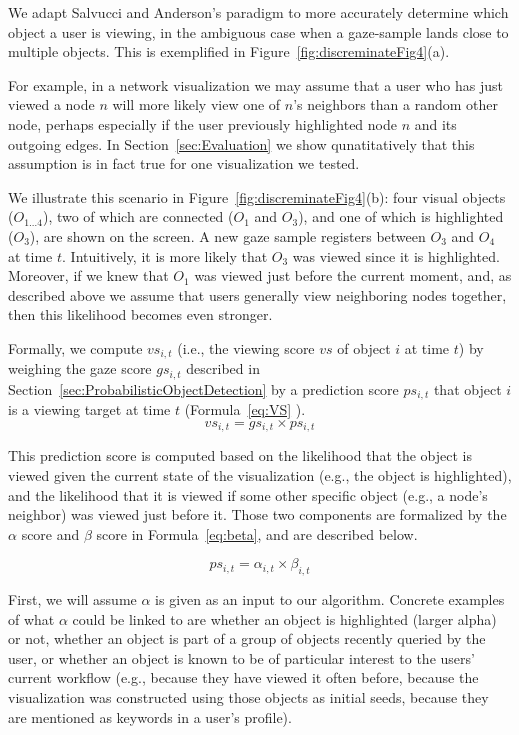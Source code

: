 We adapt Salvucci and Anderson's paradigm to more accurately determine which object a user is viewing, in the ambiguous case when a gaze-sample lands close to multiple objects. This is exemplified in Figure~\ref{fig:discreminateFig4}(a). 

For example, in a network visualization we may assume that a user who has just viewed a node $n$ will more likely view one of $n$'s neighbors than a random other node, perhaps especially if the user previously highlighted node $n$ and its outgoing edges.  In Section~\ref{sec:Evaluation} we show qunatitatively that this assumption is in fact true for one visualization we tested.  

We illustrate this scenario in Figure~\ref{fig:discreminateFig4}(b): four visual objects ($O_{1\ldots 4}$), two of which are connected ($O_1$ and $O_3$), and one of which is highlighted ($O_3$), are shown on the screen. A new gaze sample registers between $O_3$ and $O_4$ at time $t$. Intuitively, it is more likely that $O_3$ was viewed since it is highlighted. Moreover, if we knew that $O_1$ was viewed just before the current moment, and, as described above we assume that users generally view neighboring nodes together, then this likelihood becomes even stronger.     
 
Formally, we compute $vs_{i,t}$  (i.e., the viewing score $vs$ of object $i$ at time $t$) by weighing the gaze score $gs_{i,t}$ described in Section~\ref{sec:ProbabilisticObjectDetection} by a prediction score $ps_{i,t}$ that object $i$ is a viewing target at time $t$ (Formula~\ref{eq:VS} ). 
\begin{equation}
vs_{i,t} = gs_{i,t} \times ps_{i,t}
\label{eq:VS}
\end{equation}

This prediction score is computed based on the likelihood that the object is viewed given the current state of the visualization (e.g., the object is highlighted), and the likelihood that it is viewed if some other specific object (e.g.,  a node's neighbor) was viewed just before it. Those two components are formalized by the  $\alpha$ score and $\beta$ score in Formula~\ref{eq:beta}, and are described below. 

\begin{equation}
ps_{i,t} = \alpha_{i,t} \times \beta_{i,t}
\label{eq:ps}
\end{equation}

First, we will assume $\alpha$ is given as an input to our algorithm. Concrete examples of what $\alpha$ could be linked to are whether an object is highlighted (larger alpha) or not, whether an object is part of a group of objects recently queried by the user, or whether an object is known to be of particular interest to the users' current workflow (e.g., because they have viewed it often before, because the visualization was constructed using those objects as initial seeds, because they are mentioned as keywords in a user's profile). 

